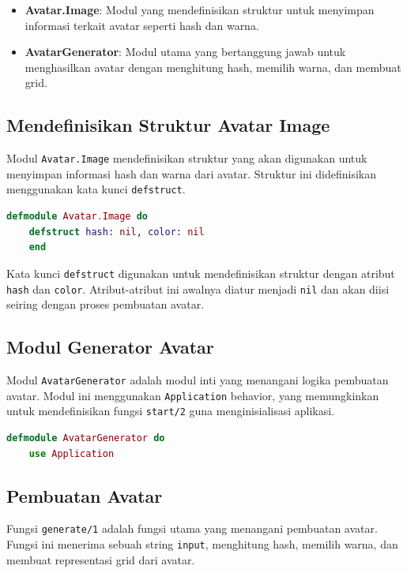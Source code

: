 \begin{itemize}
	\item \textbf{Avatar.Image}: Modul yang mendefinisikan struktur untuk menyimpan informasi terkait avatar seperti hash dan warna.
	\item \textbf{AvatarGenerator}: Modul utama yang bertanggung jawab untuk menghasilkan avatar dengan menghitung hash, memilih warna, dan membuat grid.
\end{itemize}

\subsection{Mendefinisikan Struktur Avatar Image}
Modul \texttt{Avatar.Image} mendefinisikan struktur yang akan digunakan untuk menyimpan informasi hash dan warna dari avatar. Struktur ini didefinisikan menggunakan kata kunci \texttt{defstruct}.

\begin{lstlisting}[language=Elixir, caption={Mendefinisikan struktur Avatar Image di \texttt{lib/image.ex}}]
	defmodule Avatar.Image do
	defstruct hash: nil, color: nil
	end
\end{lstlisting}

Kata kunci \texttt{defstruct} digunakan untuk mendefinisikan struktur dengan atribut \texttt{hash} dan \texttt{color}. Atribut-atribut ini awalnya diatur menjadi \texttt{nil} dan akan diisi seiring dengan proses pembuatan avatar.

\subsection{Modul Generator Avatar}
Modul \texttt{AvatarGenerator} adalah modul inti yang menangani logika pembuatan avatar. Modul ini menggunakan \texttt{Application} behavior, yang memungkinkan untuk mendefinisikan fungsi \texttt{start/2} guna menginisialisasi aplikasi.

\begin{lstlisting}[language=Elixir, caption={Definisi modul Avatar Generator di \texttt{lib/avatar.ex}}]
	defmodule AvatarGenerator do
	use Application
\end{lstlisting}

\subsection{Pembuatan Avatar}
Fungsi \texttt{generate/1} adalah fungsi utama yang menangani pembuatan avatar. Fungsi ini menerima sebuah string \texttt{input}, menghitung hash, memilih warna, dan membuat representasi grid dari avatar.

